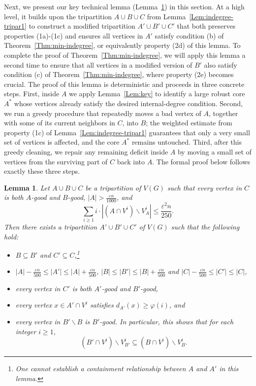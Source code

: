 \documentclass{aic}
\newtheorem{lemma}[dfn]{Lemma}
\begin{document}
	Next, we present our key technical lemma (Lemma~\ref{Lem:indegree-tripar2}) in this section.
	At a high level, it builds upon the tripartition $A \cup B \cup C$ from Lemma~\ref{Lem:indegree-tripar1} to construct a modified tripartition $A' \cup B' \cup C'$ that both preserves properties (1a)-(1c) and ensures all vertices in $A'$ satisfy condition (b) of Theorem~\ref{Thm:min-indegree}, or equivalently property (2d) of this lemma.
	To complete the proof of Theorem~\ref{Thm:min-indegree}, we will apply this lemma a second time to ensure that all vertices in a modified version of $B'$ also satisfy condition (c) of Theorem~\ref{Thm:min-indegree}, where property (2e) becomes crucial.
	The proof of this lemma is deterministic and proceeds in three concrete steps.
	First, inside $A$ we apply Lemma~\ref{Lem:key} to identify a large robust core $A^*$ whose vertices already satisfy the desired internal-degree condition.
	Second, we run a greedy procedure that repeatedly moves a bad vertex of $A$, together with some of its current neighbors in $C$, into $B$; the weighted estimate from property (1c) of Lemma~\ref{Lem:indegree-tripar1} guarantees that only a very small set of vertices is affected, and the core $A^*$ remains untouched.
	Third, after this greedy cleaning, we repair any remaining deficit inside $A$ by moving a small set of vertices from the surviving part of $C$ back into $A$.
	The formal proof below follows exactly these three steps.
	
	\begin{lemma}
		\label{Lem:indegree-tripar2}
		Let $A\cup B\cup C$ be a tripartition of $V(G)$ such that every vertex in $C$ is both $A$-good and $B$-good, $|A|>\frac{\varepsilon n}{1000}$, and
		\begin{equation}
			\label{equ:indegree condition2}
			\sum_{i\ge 1} i\cdot |(A\cap V^i)\backslash V^i_A|\le \frac{\varepsilon^2n}{250}.
		\end{equation}
		Then there exists a tripartition $A'\cup B'\cup C'$ of $V(G)$ such that the following hold:
		\begin{itemize}
			\item[(2a).] $B\subseteq B'$ and $C'\subseteq C$,\footnote{One cannot establish a containment relationship between $A$ and $A'$ in this lemma.}
			\item[(2b).] $|A|-\frac{\varepsilon n}{500}\le |A'|\le |A|+\frac{\varepsilon n}{500}$, $|B|\leq |B'|\leq |B|+\frac{\varepsilon n}{500}$ and $|C|-\frac{\varepsilon n}{500}\leq |C'|\leq |C|$,
			\item[(2c).] every vertex in $C'$ is both $A'$-good and $B'$-good,
			\item[(2d).] every vertex $x\in A'\cap V^i$ satisfies $d_{A'}(x)\ge \varphi(i)$, and
			\item[(2e).] every vertex in $B'\backslash B$ is $B'$-good. In particular, this shows that for each integer $i\geq 1$,
			\begin{equation}\label{equ:indeg B'}
				(B'\cap V^i)\backslash V^i_{B'}\subseteq (B\cap V^i)\backslash V^i_B.
			\end{equation}
		\end{itemize}
	\end{lemma}
	
\end{document}
